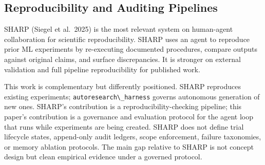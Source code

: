 \subsection{Reproducibility and Auditing Pipelines}\label{reproducibility-and-auditing-pipelines}

SHARP (Siegel et al.~2025) is the most relevant system on human-agent collaboration for scientific reproducibility. SHARP uses an agent to reproduce prior ML experiments by re-executing documented procedures, compare outputs against original claims, and surface discrepancies. It is stronger on external validation and full pipeline reproducibility for published work.

This work is complementary but differently positioned. SHARP reproduces existing experiments; \passthrough{\lstinline!autoresearch\_harness!} governs autonomous generation of new ones. SHARP's contribution is a reproducibility-checking pipeline; this paper's contribution is a governance and evaluation protocol for the agent loop that runs while experiments are being created. SHARP does not define trial lifecycle states, append-only audit ledgers, scope enforcement, failure taxonomies, or memory ablation protocols. The main gap relative to SHARP is not concept design but clean empirical evidence under a governed protocol.


